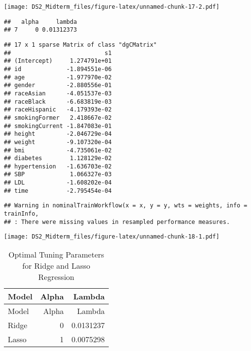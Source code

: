 \documentclass[
]{article}
\begin{document}
\texttt{[image: DS2\_Midterm\_files/figure-latex/unnamed-chunk-17-2.pdf]}

\begin{verbatim}
##   alpha     lambda
## 7     0 0.01312373
\end{verbatim}

\begin{verbatim}
## 17 x 1 sparse Matrix of class "dgCMatrix"
##                           s1
## (Intercept)     1.274791e+01
## id             -1.894551e-06
## age            -1.977970e-02
## gender         -2.880556e-01
## raceAsian      -4.051537e-03
## raceBlack      -6.683819e-03
## raceHispanic   -4.179393e-02
## smokingFormer   2.418667e-02
## smokingCurrent -1.847083e-01
## height         -2.046729e-04
## weight         -9.107320e-04
## bmi            -4.735061e-02
## diabetes        1.128129e-02
## hypertension   -1.636703e-02
## SBP             1.066327e-03
## LDL            -1.608202e-04
## time           -2.795454e-04
\end{verbatim}

\begin{verbatim}
## Warning in nominalTrainWorkflow(x = x, y = y, wts = weights, info = trainInfo,
## : There were missing values in resampled performance measures.
\end{verbatim}

\texttt{[image: DS2\_Midterm\_files/figure-latex/unnamed-chunk-18-1.pdf]}

\begin{longtable}[]{@{}lrr@{}}
\caption{Optimal Tuning Parameters for Ridge and Lasso
Regression}\tabularnewline
\toprule\noalign{}
Model & Alpha & Lambda \\
\midrule\noalign{}
\endfirsthead
\toprule\noalign{}
Model & Alpha & Lambda \\
\midrule\noalign{}
\endhead
\bottomrule\noalign{}
\endlastfoot
Ridge & 0 & 0.0131237 \\
Lasso & 1 & 0.0075298 \\
\end{longtable}
\end{document}
